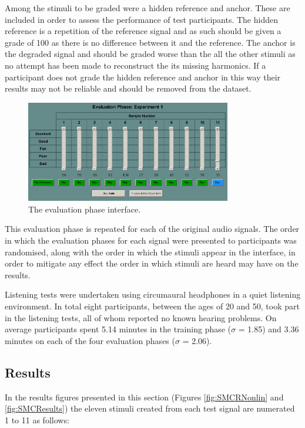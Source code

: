 			Among the stimuli to be graded were a hidden reference and anchor. These are included in order to
			assess the performance of test participants. The hidden reference is a repetition of the reference
			signal and as such should be given a grade of 100 as there is no difference between it and the
			reference. The anchor is the degraded signal and should be graded worse than the all the other
			stimuli as no attempt has been made to reconstruct the its missing harmonics. If a participant does
			not grade the hidden reference and anchor in this way their results may not be reliable and should
			be removed from the dataset.

			\begin{figure}[h!]
				\centering
				\includegraphics[width=0.8\textwidth]{chapter7/Images/MushraEvaluation.png}
				\caption{The evaluation phase interface.}
				\label{fig:MushraEvaluation}
			\end{figure}

			This evaluation phase is repeated for each of the original audio signals. The order in which the
			evaluation phases for each signal were presented to participants was randomised, along with the
			order in which the stimuli appear in the interface, in order to mitigate any effect the order in
			which stimuli are heard may have on the results.

			Listening tests were undertaken using circumaural headphones in a quiet listening environment. In
			total eight participants, between the ages of 20 and 50, took part in the listening tests, all of
			whom reported no known hearing problems. On average participants spent 5.14 minutes in the training
			phase ($\sigma$ = 1.85) and 3.36 minutes on each of the four evaluation phases ($\sigma$ = 2.06).

	\subsection{Results}
	\label{sec:PerceptualExperiments-Reconstruction-Results}
		In the results figures presented in this section (Figures \ref{fig:SMCRNonlin} and \ref{fig:SMCResults})
		the eleven stimuli created from each test signal are numerated 1 to 11 as follows:

